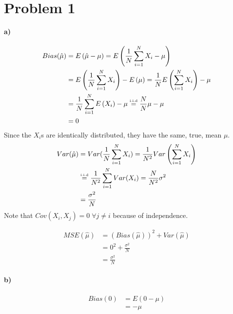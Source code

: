 \documentclass[12pt]{article}
\newcommand\iideq{\stackrel{\tiny{\mbox{i.i.d}}}{=}}
\begin{document}
\section{Problem 1}
\paragraph{a)}
\begin{equation}
\begin{split}
Bias(\hat{\mu}) 
&= E\left(\hat{\mu} - \mu\right)
= E\left(\frac{1}{N}\sum_{i=1}^NX_i-\mu\right) \\     
&= E\left(\frac{1}{N}\sum_{i=1}^NX_i\right) - E\left(\mu\right)
= \frac{1}{N}E\left(\sum_{i=1}^NX_i\right) - \mu \\
&= \frac{1}{N}\sum_{i=1}^{N}E\left(X_i\right) - \mu 
\iideq \frac{N}{N}\mu - \mu \\
&= 0
\end{split}
\end{equation}
Since the $X_i$s are identically distributed, they have the same,
true, mean $\mu$.
\begin{equation}
\begin{split}
Var(\hat{\mu})
&= Var(\frac{1}{N}\sum_{i=1}^NX_i)
= \frac{1}{N^2}Var\left(\sum_{i=1}^NX_i\right) \\
&\iideq \frac{1}{N^2}\sum_{i=1}^NVar(X_i)
= \frac{N}{N^2}\sigma^2 \\
&= \frac{\sigma^2}{N}
\end{split}
\end{equation}
Note that $Cov(X_i, X_j) = 0\; \forall j\neq i$ because of independence.

\begin{equation}
\begin{split}
MSE(\hat{\mu})
&= \left(Bias(\hat{\mu})\right)^2 + Var(\hat{\mu}) \\
&= 0^2 + \frac{\sigma^2}{N} \\
&= \frac{\sigma^2}{N}
\end{split}
\end{equation}


\paragraph{b)}
\begin{equation}
\begin{split}
Bias(0) &= E\left(0 - \mu\right) \\
        &= -\mu
\end{split}
\end{equation}
\end{document}
